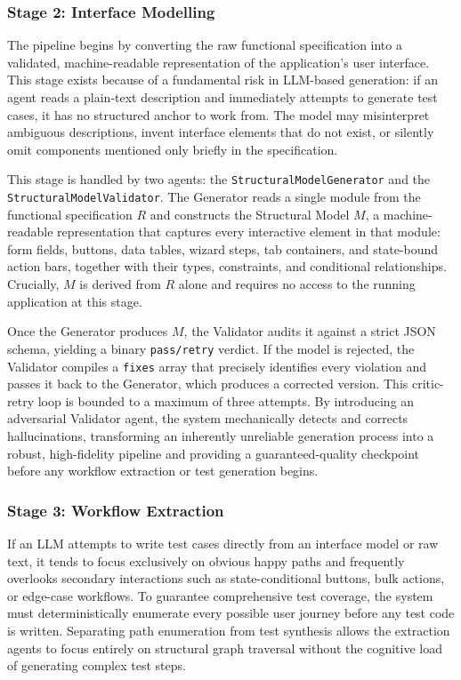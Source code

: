 \subsubsection{Stage 2: Interface Modelling}

The pipeline begins by converting the raw functional specification into a validated, machine-readable representation of the application's user interface. This stage exists because of a fundamental risk in LLM-based generation: if an agent reads a plain-text description and immediately attempts to generate test cases, it has no structured anchor to work from. The model may misinterpret ambiguous descriptions, invent interface elements that do not exist, or silently omit components mentioned only briefly in the specification.

This stage is handled by two agents: the \texttt{StructuralModelGenerator} and the \texttt{StructuralModelValidator}. The Generator reads a single module from the functional specification $R$ and constructs the Structural Model $M$, a machine-readable representation that captures every interactive element in that module: form fields, buttons, data tables, wizard steps, tab containers, and state-bound action bars, together with their types, constraints, and conditional relationships. Crucially, $M$ is derived from $R$ alone and requires no access to the running application at this stage.

Once the Generator produces $M$, the Validator audits it against a strict JSON schema, yielding a binary \texttt{pass/retry} verdict. If the model is rejected, the Validator compiles a \texttt{fixes} array that precisely identifies every violation and passes it back to the Generator, which produces a corrected version. This critic-retry loop is bounded to a maximum of three attempts. By introducing an adversarial Validator agent, the system mechanically detects and corrects hallucinations, transforming an inherently unreliable generation process into a robust, high-fidelity pipeline and providing a guaranteed-quality checkpoint before any workflow extraction or test generation begins.

\subsubsection{Stage 3: Workflow Extraction}

If an LLM attempts to write test cases directly from an interface model or raw text, it tends to focus exclusively on obvious happy paths and frequently overlooks secondary interactions such as state-conditional buttons, bulk actions, or edge-case workflows. To guarantee comprehensive test coverage, the system must deterministically enumerate every possible user journey before any test code is written. Separating path enumeration from test synthesis allows the extraction agents to focus entirely on structural graph traversal without the cognitive load of generating complex test steps.

